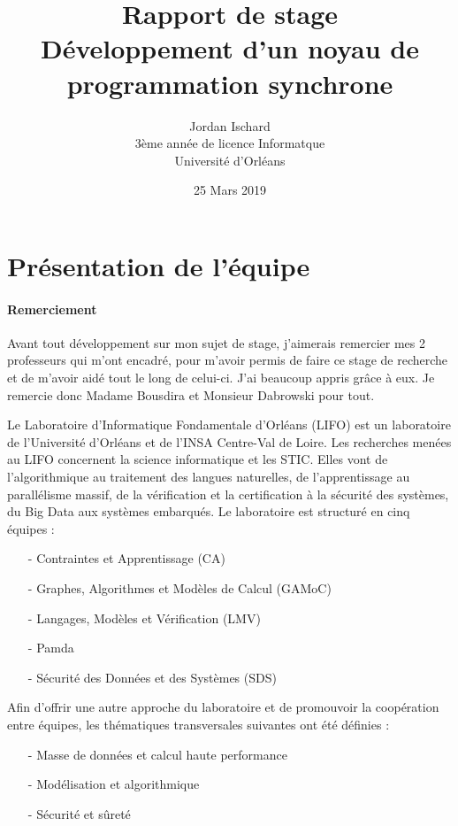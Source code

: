\documentclass[10pt,a4paper]{article}
\begin{document}
		
	\title{\textbf{Rapport de stage \\ Développement d'un noyau de programmation synchrone}}
	\date{25 Mars 2019}
	\author{Jordan Ischard\\3ème année de licence Informatque \\ Université d'Orléans}
	\maketitle
	\newpage
	
	
	\tableofcontents
	\newpage
	
	\section{Présentation de l'équipe}
		\paragraph{Remerciement}
		Avant tout développement sur mon sujet de stage, j'aimerais remercier mes 2 professeurs qui m'ont encadré, pour m'avoir permis de faire ce stage de recherche et de m'avoir aidé tout le long de celui-ci. J'ai beaucoup appris grâce à eux. Je remercie donc Madame Bousdira et Monsieur Dabrowski pour tout.
		\bigbreak
		
		
		Le Laboratoire d'Informatique Fondamentale d'Orléans (LIFO) est un laboratoire de l'Université d'Orléans et de l'INSA Centre-Val de Loire. 
		\smallbreak
		Les recherches menées au LIFO concernent la science informatique et les STIC. Elles vont de l'algorithmique au traitement des langues naturelles, de l'apprentissage au parallélisme massif, de la vérification et la certification à la sécurité des systèmes, du Big Data aux systèmes embarqués. Le laboratoire est structuré en cinq équipes :
		\begin{enumerate}
			\item[-] Contraintes et Apprentissage (CA)
			\item[-] Graphes, Algorithmes et Modèles de Calcul (GAMoC)
			\item[-] Langages, Modèles et Vérification (LMV)
			\item[-] Pamda
			\item[-] Sécurité des Données et des Systèmes (SDS)
		\end{enumerate}
		\medbreak
		
		Afin d'offrir une autre approche du laboratoire et de promouvoir la coopération entre équipes, les thématiques transversales suivantes ont été définies :
		\begin{enumerate}
			\item[-] Masse de données et calcul haute performance
			\item[-] Modélisation et algorithmique
			\item[-] Sécurité et sûreté
		\end{enumerate}
		\medbreak
		
\end{document}
